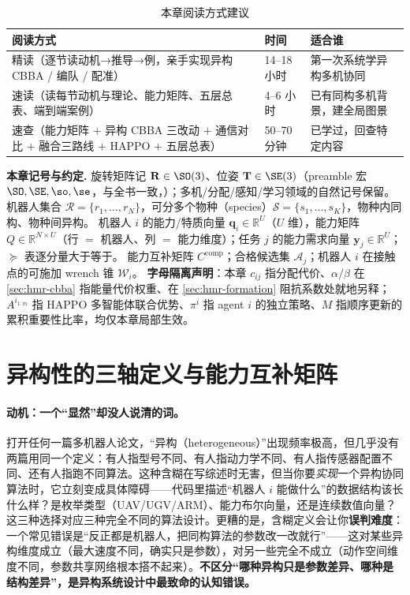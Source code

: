 \begin{table}[H]\centering\small
\caption{本章阅读方式建议}
\label{tab:hmr-reading}
\begin{tabular}{lll}
\toprule
阅读方式 & 时间 & 适合谁 \\
\midrule
精读（逐节读动机→推导→例，亲手实现异构 CBBA / 编队 / 配准） & 14--18 小时 & 第一次系统学异构多机协同 \\
速读（读每节动机与理论、能力矩阵、五层总表、端到端案例） & 4--6 小时 & 已有同构多机背景，建全局图景 \\
速查（能力矩阵 $+$ 异构 CBBA 三改动 $+$ 通信对比 $+$ 融合三路线 $+$ HAPPO $+$ 五层总表） & 50--70 分钟 & 已学过，回查特定内容 \\
\bottomrule
\end{tabular}
\end{table}

\begin{note}
\textbf{本章记号与约定.}\;
旋转矩阵记 $\mathbf{R}\in\SO(3)$、位姿 $\mathbf{T}\in\SE(3)$（preamble 宏 $\SO,\SE,\so,\se$，与全书一致，）；多机/分配/感知/学习领域的自然记号保留。
机器人集合 $\mathcal{R}=\{r_1,\dots,r_N\}$，可分多个物种（species）$\mathcal{S}=\{s_1,\dots,s_K\}$，物种内同构、物种间异构。
机器人 $i$ 的能力/特质向量 $\mathbf{q}_i\in\mathbb{R}^U$（$U$ 维），能力矩阵 $Q\in\mathbb{R}^{N\times U}$（行 $=$ 机器人、列 $=$ 能力维度）；任务 $j$ 的能力需求向量 $\mathbf{y}_j\in\mathbb{R}^U$；$\succeq$ 表逐分量大于等于。
能力互补矩阵 $C^{\mathrm{comp}}$；合格候选集 $\mathcal{A}_j$；机器人 $i$ 在接触点的可施加 wrench 锥 $\mathcal{W}_i$。
\textbf{字母隔离声明}：本章 $c_{ij}$ 指分配代价、$\alpha/\beta$ 在 \cref{sec:hmr-cbba} 指能量代价权重、在 \cref{sec:hmr-formation} 阻抗系数处就地另释；$A^{i_{1:m}}$ 指 HAPPO 多智能体联合优势、$\pi^i$ 指 agent $i$ 的独立策略、$M$ 指顺序更新的累积重要性比率，均仅本章局部生效。
\end{note}

\section{异构性的三轴定义与能力互补矩阵}
\label{sec:hmr-axes}

\paragraph{动机：一个“显然”却没人说清的词。}
打开任何一篇多机器人论文，“异构（heterogeneous）”出现频率极高，但几乎没有两篇用同一个定义：有人指型号不同、有人指动力学不同、有人指传感器配置不同、还有人指跑不同算法。这种含糊在写综述时无害，但当你要\emph{实现}一个异构协同算法时，它立刻变成具体障碍——代码里描述“机器人 $i$ 能做什么”的数据结构该长什么样？是枚举类型（UAV/UGV/ARM）、能力布尔向量，还是连续数值向量？这三种选择对应三种完全不同的算法设计。更糟的是，含糊定义会让你\textbf{误判难度}：一个常见错误是“反正都是机器人，把同构算法的参数改一改就行”——这对某些异构维度成立（最大速度不同，确实只是参数），对另一些完全不成立（动作空间维度不同，参数共享网络根本搭不起来）。\textbf{不区分“哪种异构只是参数差异、哪种是结构差异”，是异构系统设计中最致命的认知错误。}


